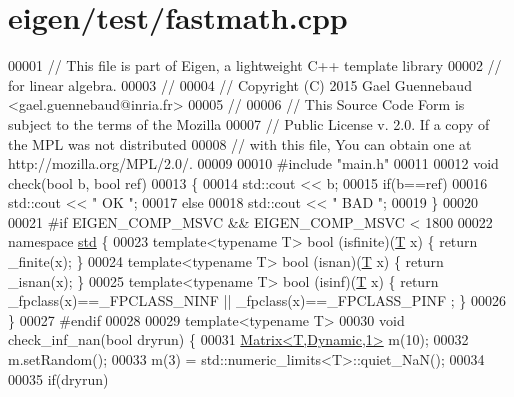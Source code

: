 \hypertarget{eigen_2test_2fastmath_8cpp_source}{}\section{eigen/test/fastmath.cpp}
\label{eigen_2test_2fastmath_8cpp_source}

\begin{DoxyCode}
00001 \textcolor{comment}{// This file is part of Eigen, a lightweight C++ template library}
00002 \textcolor{comment}{// for linear algebra.}
00003 \textcolor{comment}{//}
00004 \textcolor{comment}{// Copyright (C) 2015 Gael Guennebaud <gael.guennebaud@inria.fr>}
00005 \textcolor{comment}{//}
00006 \textcolor{comment}{// This Source Code Form is subject to the terms of the Mozilla}
00007 \textcolor{comment}{// Public License v. 2.0. If a copy of the MPL was not distributed}
00008 \textcolor{comment}{// with this file, You can obtain one at http://mozilla.org/MPL/2.0/.}
00009 
00010 \textcolor{preprocessor}{#include "main.h"}
00011 
00012 \textcolor{keywordtype}{void} check(\textcolor{keywordtype}{bool} b, \textcolor{keywordtype}{bool} ref)
00013 \{
00014   std::cout << b;
00015   \textcolor{keywordflow}{if}(b==ref)
00016     std::cout << \textcolor{stringliteral}{" OK  "};
00017   \textcolor{keywordflow}{else}
00018     std::cout << \textcolor{stringliteral}{" BAD "};
00019 \}
00020 
00021 \textcolor{preprocessor}{#if EIGEN\_COMP\_MSVC && EIGEN\_COMP\_MSVC < 1800}
00022 \textcolor{keyword}{namespace }\hyperlink{namespacestd}{std} \{
00023   \textcolor{keyword}{template}<\textcolor{keyword}{typename} T> bool (isfinite)(\hyperlink{group___sparse_core___module}{T} x) \{ \textcolor{keywordflow}{return} \_finite(x); \}
00024   \textcolor{keyword}{template}<\textcolor{keyword}{typename} T> bool (isnan)(\hyperlink{group___sparse_core___module}{T} x) \{ \textcolor{keywordflow}{return} \_isnan(x); \}
00025   \textcolor{keyword}{template}<\textcolor{keyword}{typename} T> bool (isinf)(\hyperlink{group___sparse_core___module}{T} x) \{ \textcolor{keywordflow}{return} \_fpclass(x)==\_FPCLASS\_NINF || \_fpclass(x)==\_FPCLASS\_PINF
      ; \}
00026 \}
00027 \textcolor{preprocessor}{#endif}
00028 
00029 \textcolor{keyword}{template}<\textcolor{keyword}{typename} T>
00030 \textcolor{keywordtype}{void} check\_inf\_nan(\textcolor{keywordtype}{bool} dryrun) \{
00031   \hyperlink{group___core___module_class_eigen_1_1_matrix}{Matrix<T,Dynamic,1>} m(10);
00032   m.setRandom();
00033   m(3) = std::numeric\_limits<T>::quiet\_NaN();
00034 
00035   \textcolor{keywordflow}{if}(dryrun)

\end{DoxyCode}
